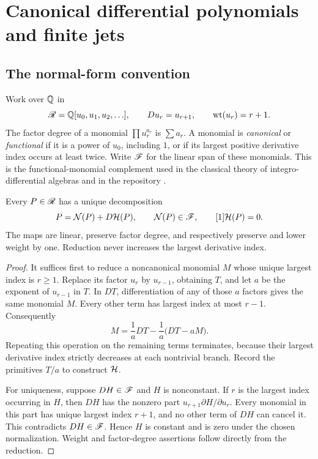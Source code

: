 \section{Canonical differential polynomials and finite jets}
\label{sec:algebra}

\subsection{The normal-form convention}

Work over $\mathbb Q$ in
\[
 \mathscr R=\mathbb Q[u_0,u_1,u_2,\ldots],\qquad Du_r=u_{r+1},
 \qquad \operatorname{wt}(u_r)=r+1.
\]
The factor degree of a monomial $\prod u_r^{a_r}$ is $\sum a_r$. A monomial is \emph{canonical} or \emph{functional} if it is a power of $u_0$, including $1$, or if its largest positive derivative index occurs at least twice. Write $\mathscr F$ for the linear span of these monomials. This is the functional-monomial complement used in the classical theory of integro-differential algebras \cite[Proposition 4.10]{Guo2014} and in the repository \cite{RepoSector}.

\begin{proposition}\label{prop:normal}
Every $P\in\mathscr R$ has a unique decomposition
\begin{equation}\label{eq:normal}
 P=\mathcal N(P)+D\mathcal H(P),\qquad \mathcal N(P)\in\mathscr F,
 \qquad [1]\mathcal H(P)=0.
\end{equation}
The maps are linear, preserve factor degree, and respectively preserve and lower weight by one. Reduction never increases the largest derivative index.
\end{proposition}

\begin{proof}
It suffices first to reduce a noncanonical monomial $M$ whose unique largest index is $r\ge1$. Replace its factor $u_r$ by $u_{r-1}$, obtaining $T$, and let $a$ be the exponent of $u_{r-1}$ in $T$. In $DT$, differentiation of any of those $a$ factors gives the same monomial $M$. Every other term has largest index at most $r-1$. Consequently
\[
 M=\frac1aDT-\frac1a\bigl(DT-aM\bigr).
\]
Repeating this operation on the remaining terms terminates, because their largest derivative index strictly decreases at each nontrivial branch. Record the primitives $T/a$ to construct $\mathcal H$.

For uniqueness, suppose $DH\in\mathscr F$ and $H$ is nonconstant. If $r$ is the largest index occurring in $H$, then $DH$ has the nonzero part
$u_{r+1}\partial H/\partial u_r$. Every monomial in this part has unique largest index $r+1$, and no other term of $DH$ can cancel it. This contradicts $DH\in\mathscr F$. Hence $H$ is constant and is zero under the chosen normalization. Weight and factor-degree assertions follow directly from the reduction.
\end{proof}

